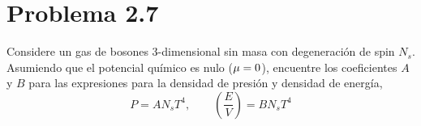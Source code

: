 \section{Problema 2.7}\label{prob:2.7}
\begin{tcolorbox}
\begin{problema}
	Considere un gas de bosones $3$-dimensional sin masa con degeneración de spin $N_s$. Asumiendo que el potencial químico es nulo ($\mu=0$), encuentre los coeficientes $A$ y $B$ para las expresiones para la densidad de presión y densidad de energía,
	\begin{equation}
  P=AN_sT^4,\qquad \left(\frac{E}{V}\right)=BN_sT^4
\end{equation}
\end{problema}
\end{tcolorbox}

